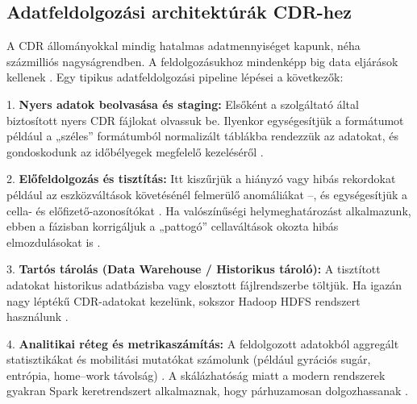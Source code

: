 \subsection{Adatfeldolgozási architektúrák CDR-hez}
  
A CDR állományokkal mindig hatalmas adatmennyiséget kapunk, néha százmilliós nagyságrendben. A feldolgozásukhoz mindenképp big data eljárások kellenek \cite{pinter2022awakening, zhang2019connected}. Egy tipikus adatfeldolgozási pipeline lépései a következők:

1. \textbf{Nyers adatok beolvasása és staging:} Elsőként a szolgáltató által biztosított nyers CDR fájlokat olvassuk be. Ilyenkor egységesítjük a formátumot például a „széles” formátumból normalizált táblákba rendezzük az adatokat, és gondoskodunk az időbélyegek megfelelő kezeléséről \cite{pinter2022awakening}.

2. \textbf{Előfeldolgozás és tisztítás:} Itt kiszűrjük a hiányzó vagy hibás rekordokat például az eszközváltások követésénél felmerülő anomáliákat –, és egységesítjük a cella- és előfizető-azonosítókat \cite{pinter2020artificial, pinter2022awakening}. Ha valószínűségi helymeghatározást alkalmazunk, ebben a fázisban korrigáljuk a „pattogó” cellaváltások okozta hibás elmozdulásokat is \cite{traag2011social}.

3. \textbf{Tartós tárolás (Data Warehouse / Historikus tároló):} A tisztított adatokat historikus adatbázisba vagy elosztott fájlrendszerbe töltjük. Ha igazán nagy léptékű CDR-adatokat kezelünk, sokszor Hadoop HDFS rendszert használunk \cite{zhang2019connected}.

4. \textbf{Analitikai réteg és metrikaszámítás:} A feldolgozott adatokból aggregált statisztikákat és mobilitási mutatókat számolunk (például gyrációs sugár, entrópia, home–work távolság) \cite{pinter2020artificial, pinter2021evaluating}. A skálázhatóság miatt a modern rendszerek gyakran Spark keretrendszert alkalmaznak, hogy párhuzamosan dolgozhassanak \cite{zhang2019connected}.

